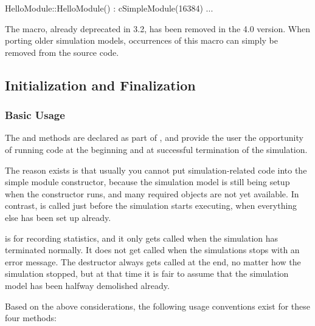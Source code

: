 \begin{cpp}
HelloModule::HelloModule() : cSimpleModule(16384) {...}
\end{cpp}

\begin{note}
    The  macro, already deprecated in {\opp} 3.2,
    has been removed in the 4.0 version. When porting older simulation models,
    occurrences of this macro can simply be removed from the source code.
\end{note}


\subsection{Initialization and Finalization}
\label{sec:simple-modules:initialize-and-finish}

\subsubsection{Basic Usage}
\label{sec:simple-modules:init-finish:basic-usage}

The  and  methods are declared
as part of , and provide the user the opportunity
of running code at the beginning and at successful termination of the
simulation.

The reason  exists is that usually you cannot put
simulation-related code into the simple module
constructor, because the simulation model is still
being setup when the constructor runs, and many required objects are not yet
available. In contrast,  is called just before the
simulation starts executing, when everything else has been set up
already.

 is for recording statistics, and it only gets called
when the simulation has terminated normally. It does not get called when
the simulations stops with an error message. The destructor always
gets called at the end, no matter how the simulation stopped, but
at that time it is fair to assume that the simulation model has been
halfway demolished already.

Based on the above considerations, the following usage conventions exist
for these four methods:

